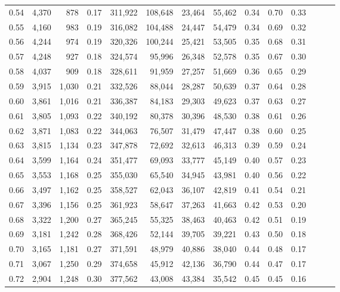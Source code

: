 \begin{tabular}{rrrrrrrrrrrrrr}
0.54 &  4,370 &    878 &  0.17 &  311,922 &  108,648 &  23,464 &  55,462 &  0.34 &  0.70 &      0.33 \\
0.55 &  4,160 &    983 &  0.19 &  316,082 &  104,488 &  24,447 &  54,479 &  0.34 &  0.69 &      0.32 \\
0.56 &  4,244 &    974 &  0.19 &  320,326 &  100,244 &  25,421 &  53,505 &  0.35 &  0.68 &      0.31 \\
0.57 &  4,248 &    927 &  0.18 &  324,574 &   95,996 &  26,348 &  52,578 &  0.35 &  0.67 &      0.30 \\
0.58 &  4,037 &    909 &  0.18 &  328,611 &   91,959 &  27,257 &  51,669 &  0.36 &  0.65 &      0.29 \\
0.59 &  3,915 &  1,030 &  0.21 &  332,526 &   88,044 &  28,287 &  50,639 &  0.37 &  0.64 &      0.28 \\
0.60 &  3,861 &  1,016 &  0.21 &  336,387 &   84,183 &  29,303 &  49,623 &  0.37 &  0.63 &      0.27 \\
0.61 &  3,805 &  1,093 &  0.22 &  340,192 &   80,378 &  30,396 &  48,530 &  0.38 &  0.61 &      0.26 \\
0.62 &  3,871 &  1,083 &  0.22 &  344,063 &   76,507 &  31,479 &  47,447 &  0.38 &  0.60 &      0.25 \\
0.63 &  3,815 &  1,134 &  0.23 &  347,878 &   72,692 &  32,613 &  46,313 &  0.39 &  0.59 &      0.24 \\
0.64 &  3,599 &  1,164 &  0.24 &  351,477 &   69,093 &  33,777 &  45,149 &  0.40 &  0.57 &      0.23 \\
0.65 &  3,553 &  1,168 &  0.25 &  355,030 &   65,540 &  34,945 &  43,981 &  0.40 &  0.56 &      0.22 \\
0.66 &  3,497 &  1,162 &  0.25 &  358,527 &   62,043 &  36,107 &  42,819 &  0.41 &  0.54 &      0.21 \\
0.67 &  3,396 &  1,156 &  0.25 &  361,923 &   58,647 &  37,263 &  41,663 &  0.42 &  0.53 &      0.20 \\
0.68 &  3,322 &  1,200 &  0.27 &  365,245 &   55,325 &  38,463 &  40,463 &  0.42 &  0.51 &      0.19 \\
0.69 &  3,181 &  1,242 &  0.28 &  368,426 &   52,144 &  39,705 &  39,221 &  0.43 &  0.50 &      0.18 \\
0.70 &  3,165 &  1,181 &  0.27 &  371,591 &   48,979 &  40,886 &  38,040 &  0.44 &  0.48 &      0.17 \\
0.71 &  3,067 &  1,250 &  0.29 &  374,658 &   45,912 &  42,136 &  36,790 &  0.44 &  0.47 &      0.17 \\
0.72 &  2,904 &  1,248 &  0.30 &  377,562 &   43,008 &  43,384 &  35,542 &  0.45 &  0.45 &      0.16 \\

\end{tabular}
